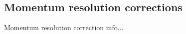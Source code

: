 \subsection{Momentum resolution corrections}
\label{sec:MomResCorrectFit}

Momentum resolution correction info...